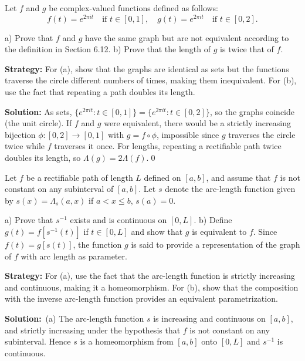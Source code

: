 \begin{problembox}
Let $f$ and $g$ be complex-valued functions defined as follows:
\[f(t) = e^{2\pi it} \quad \text{if } t \in [0, 1], \quad g(t) = e^{2\pi it} \quad \text{if } t \in [0, 2].\]

a) Prove that $f$ and $g$ have the same graph but are not equivalent according to the definition in Section 6.12.
b) Prove that the length of $g$ is twice that of $f$.
\end{problembox}

\noindent\textbf{Strategy:} For (a), show that the graphs are identical as sets but the functions traverse the circle different numbers of times, making them inequivalent. For (b), use the fact that repeating a path doubles its length.

\bigskip\noindent\textbf{Solution:}
As sets, $\{e^{2\pi it}:t\in[0,1]\}=\{e^{2\pi it}:t\in[0,2]\}$, so the graphs coincide (the unit circle). If $f$ and $g$ were equivalent, there would be a strictly increasing bijection $\phi:[0,2]\to[0,1]$ with $g=f\circ\phi$, impossible since $g$ traverses the circle twice while $f$ traverses it once. For lengths, repeating a rectifiable path twice doubles its length, so $\Lambda(g)=2\Lambda(f)$.\qed


\begin{problembox}
Let $f$ be a rectifiable path of length $L$ defined on $[a, b]$, and assume that $f$ is not constant on any subinterval of $[a, b]$. Let $s$ denote the arc-length function given by $s(x) = \Lambda_s(a, x)$ if $a < x \leq b$, $s(a) = 0$.

a) Prove that $s^{-1}$ exists and is continuous on $[0, L]$.
b) Define $g(t) = f[s^{-1}(t)]$ if $t \in [0, L]$ and show that $g$ is equivalent to $f$. Since $f(t) = g[s(t)]$, the function $g$ is said to provide a representation of the graph of $f$ with arc length as parameter.
\end{problembox}

\noindent\textbf{Strategy:} For (a), use the fact that the arc-length function is strictly increasing and continuous, making it a homeomorphism. For (b), show that the composition with the inverse arc-length function provides an equivalent parametrization.

\bigskip\noindent\textbf{Solution:}
\,(a) The arc-length function $s$ is increasing and continuous on $[a,b]$, and strictly increasing under the hypothesis that $f$ is not constant on any subinterval. Hence $s$ is a homeomorphism from $[a,b]$ onto $[0,L]$ and $s^{-1}$ is continuous.

